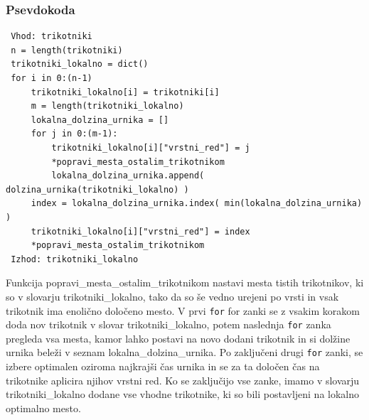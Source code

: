 \documentclass[a4paper,12pt]{article}
\theoremstyle{definition}
\theoremstyle{plain}
\begin{document}
\subsubsection{Psevdokoda}
\begin{verbatim}
 Vhod: trikotniki
 n = length(trikotniki)
 trikotniki_lokalno = dict()
 for i in 0:(n-1)
     trikotniki_lokalno[i] = trikotniki[i]
     m = length(trikotniki_lokalno)
     lokalna_dolzina_urnika = []
     for j in 0:(m-1):
         trikotniki_lokalno[i]["vrstni_red"] = j
         *popravi_mesta_ostalim_trikotnikom
         lokalna_dolzina_urnika.append( dolzina_urnika(trikotniki_lokalno) )
     index = lokalna_dolzina_urnika.index( min(lokalna_dolzina_urnika) )
     trikotniki_lokalno[i]["vrstni_red"] = index
     *popravi_mesta_ostalim_trikotnikom
 Izhod: trikotniki_lokalno

\end{verbatim}


Funkcija popravi\_mesta\_ostalim\_trikotnikom nastavi mesta tistih trikotnikov, ki so v slovarju trikotniki\_lokalno, tako da so še vedno urejeni po vrsti in vsak trikotnik ima enolično določeno mesto.
V prvi \texttt{for} for zanki se z vsakim korakom doda nov trikotnik v slovar trikotniki\_lokalno, potem naslednja \texttt{for} zanka pregleda vsa mesta, kamor lahko postavi na novo dodani trikotnik in si dolžine urnika beleži v seznam lokalna\_dolzina\_urnika. Po zaključeni drugi \texttt{for} zanki, se izbere optimalen oziroma najkrajši čas urnika in se za ta določen čas na trikotnike aplicira njihov vrstni red.
Ko se zaključijo vse zanke, imamo v slovarju trikotniki\_lokalno dodane vse vhodne trikotnike, ki so bili postavljeni na lokalno optimalno mesto.


\end{document}
